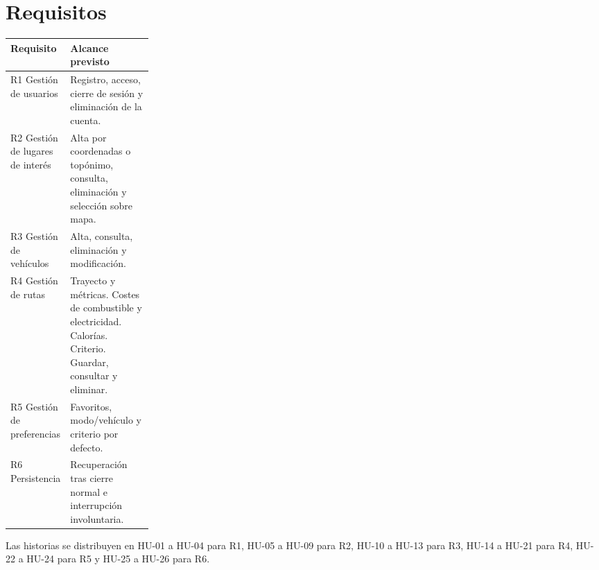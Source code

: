 \clearpage\section{Requisitos}\label{sec2}

\begingroup\fontsize{9.5}{11}\selectfont\setlength{\tabcolsep}{3pt}
\begin{tabularx}{\linewidth}{@{}p{0.24\linewidth}Y@{}}\toprule
\textbf{Requisito} & \textbf{Alcance previsto}\\\midrule
R1 \textperiodcentered{} Gestión de usuarios & Registro, acceso, cierre de sesión y eliminación de la cuenta.\\[3pt]
R2 \textperiodcentered{} Gestión de lugares de interés & Alta por coordenadas o topónimo, consulta, eliminación y selección sobre mapa.\\[3pt]
R3 \textperiodcentered{} Gestión de vehículos & Alta, consulta, eliminación y modificación.\\[3pt]
R4 \textperiodcentered{} Gestión de rutas & Trayecto y métricas. Costes de combustible y electricidad. Calorías. Criterio. Guardar, consultar y eliminar.\\[3pt]
R5 \textperiodcentered{} Gestión de preferencias & Favoritos, modo/vehículo y criterio por defecto.\\[3pt]
R6 \textperiodcentered{} Persistencia & Recuperación tras cierre normal e interrupción involuntaria.\\[3pt]
\bottomrule\end{tabularx}\endgroup\par

Las historias se distribuyen en HU-01 a HU-04 para R1, HU-05 a HU-09 para R2, HU-10 a HU-13 para R3, HU-14 a HU-21 para R4, HU-22 a HU-24 para R5 y HU-25 a HU-26 para R6.\par
